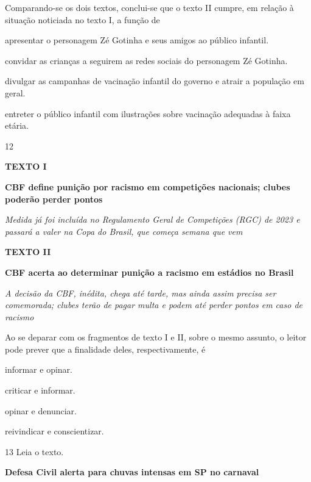 Comparando-se os dois textos, conclui-se que o texto II cumpre, em
relação à situação noticiada no texto I, a função de

\begin{escolha}
\item apresentar o personagem Zé Gotinha e seus amigos ao público infantil.

\item convidar as crianças a seguirem as redes sociais do personagem Zé
Gotinha.

\item divulgar as campanhas de vacinação infantil do governo e atrair a
população em geral.

\item entreter o público infantil com ilustrações sobre vacinação adequadas
à faixa etária.
\end{escolha}

\num{12}

\textbf{TEXTO I}

\textbf{CBF define punição por racismo em competições nacionais; clubes poderão perder pontos}

\textit{Medida já foi incluída no Regulamento Geral de Competições (RGC) de 2023 e passará a valer na Copa do Brasil, que começa semana que vem}


\textbf{TEXTO II}

\textbf{CBF acerta ao determinar punição a racismo em estádios no Brasil}

\textit{A decisão da CBF, inédita, chega até tarde, mas ainda assim precisa ser comemorada; clubes terão de pagar multa e podem até perder pontos em caso de racismo}

Ao se deparar com os fragmentos de texto I e II, sobre o mesmo assunto,
o leitor pode prever que a finalidade deles, respectivamente, é

\begin{escolha}
\item informar e opinar.

\item criticar e informar.

\item opinar e denunciar.

\item reivindicar e conscientizar.
\end{escolha}

\num{13} Leia o texto.

\textbf{Defesa Civil alerta para chuvas intensas em SP no carnaval}

